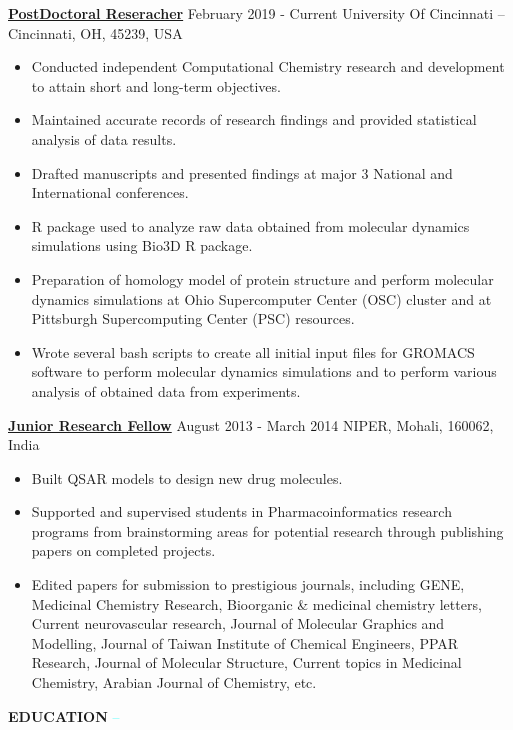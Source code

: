 \documentclass{article}
\newcommand\liner{\leavevmode\xleaders\hbox{\textcolor{cyan}{--}}\hfill\kern0pt}
\begin{document}
\normalsize{
\textbf{\underline{PostDoctoral Reseracher}} \hfill February 2019 - Current
\flushright University Of Cincinnati – Cincinnati, OH, 45239, USA
\begin{itemize}
\item Conducted independent Computational Chemistry research and development to attain short and long-term objectives.
\item Maintained accurate records of research findings and provided statistical analysis of data results.
\item Drafted manuscripts and presented findings at major 3 National and International conferences.
\item R package used to analyze raw data obtained from molecular dynamics simulations using Bio3D R package.
\item Preparation of homology model of protein structure and perform molecular dynamics simulations at Ohio Supercomputer Center (OSC) cluster and at Pittsburgh Supercomputing Center (PSC) resources.
\item Wrote several bash scripts to create all initial input files for GROMACS software to perform molecular dynamics simulations and to perform various analysis of obtained data from experiments.
\end{itemize}}
\normalsize{
\textbf{\underline{Junior Research Fellow}} \hfill August 2013 - March 2014
\flushright NIPER, Mohali, 160062, India
\begin{itemize}
\item Built QSAR models to design new drug molecules.
\item Supported and supervised students in Pharmacoinformatics research programs from brainstorming areas for potential research through publishing papers on completed projects.
\item Edited papers for submission to prestigious journals, including GENE, Medicinal Chemistry Research, Bioorganic \& medicinal chemistry letters, Current neurovascular research, Journal of Molecular Graphics and Modelling, Journal of Taiwan Institute of Chemical Engineers, PPAR Research, Journal of Molecular Structure, Current topics in Medicinal Chemistry, Arabian Journal of Chemistry, etc.
\end{itemize}}


\large{\textcolor{brey}{\textbf{EDUCATION}}} \liner
\vspace{10pt}
\end{document}
